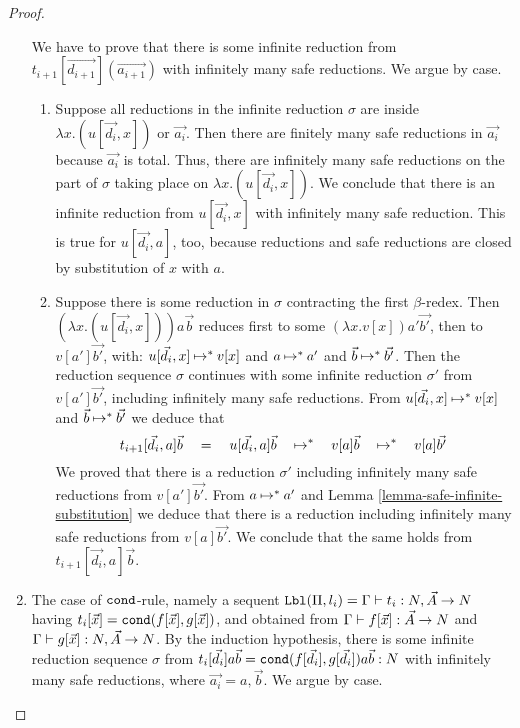 \begin{proof}
\begin{enumerate}
  We have to prove that there is some infinite reduction from 
  $t_{i+1}[\vec{d_{i+1}}](\vec{a_{i+1}})$ with infinitely
  many safe reductions. We argue by case.

\begin{enumerate}
\item
 Suppose all reductions in the infinite reduction $\sigma$ 
  are inside $\lambda x.(u[\vec{d_i},x])$ or $\vec{a_i}$.
 Then there are finitely many safe reductions in $\vec{a_i}$ because $\vec{a_i}$ is total.
 Thus, there are infinitely many safe reductions on the part of $\sigma$
  taking place on $\lambda x.(u[\vec{d_i},x])$.
  We conclude that there is an infinite reduction from $u[\vec{d_i},x]$ with infinitely many safe reduction.
  This is true for $u[\vec{d_i},a]$, too, because reductions and safe reductions are closed by substitution
  of $x$ with $a$.

\item
 Suppose there is some reduction in $\sigma$ contracting the first $\beta$-redex.
 Then  $(\lambda x.(u[\vec{d_i},x]))a\vec{b}$ reduces first to some
 $ (\lambda x.v[x])a'\vec{b'}$, then to $v[a']\vec{b'}$, with: 
 $u[\vec{d_i},x] \mathbin{\mapsto}^* v[x]$ and $a\mathbin{\mapsto}^* a'$ and $\vec{b} \mathbin{\mapsto}^* \vec{b'}$.
 Then the reduction sequence $\sigma$ continues 
  with some infinite reduction $\sigma'$ from $v[a']\vec{b'}$, including infinitely many safe reductions. 
 From $u[\vec{d_i},x] \mathbin{\mapsto}^* v[x]$ and $\vec{b} \mathbin{\mapsto}^* \vec{b'}$ we deduce that 
$$
        		t_{i+1}[\vec{d_i},a]\vec{b}  
\ \ \ 		=
\ \ \     u[\vec{d_i},a]\vec{b} 
\ \ \    \mathbin{\mapsto}^*
\ \ \    v[a]\vec{b}
\ \ \    \mathbin{\mapsto}^*
 \ \ \   v[a]\vec{b'}
$$ 
 We proved that there is a reduction $\sigma'$ including infinitely many safe reductions from  $v[a']\vec{b'}$.
 From $a \mathbin{\mapsto}^* a'$ and Lemma \ref{lemma-safe-infinite-substitution} 
 we deduce that there is a reduction including infinitely many safe reductions from  $v[a]\vec{b'}$.
 We conclude that the same holds from  $t_{i+1}[\vec{d_i},a]\vec{b}$.
\end{enumerate}



\item
  The case of ${\tt cond}$-rule, namely a sequent
  ${\tt Lbl}(\Pi,l_i) = \Gamma\vdash t_i:{N},\vec{A}\rightarrow{N}$
  having $t_i[\vec{x}] = {\tt cond}(f[\vec{x}],g[\vec{x}])$,
  and obtained from 
  $\Gamma\vdash f[\vec{x}]:\vec{A}\rightarrow{N}$
  and
  $\Gamma\vdash g[\vec{x}]:{N},\vec{A}\rightarrow{N}$. 
  By the induction hypothesis, there is some infinite reduction sequence $\sigma$ from
  $t_i[\vec{d_i}]a \vec{b} = {\tt cond}(f[\vec{d_i}],g[\vec{d_i}])a\vec{b}:{N}$
  with infinitely many safe reductions,
  where $\vec{a_i} = a,\vec{b}$. 
  We argue by case.


\end{enumerate}
\end{proof}
